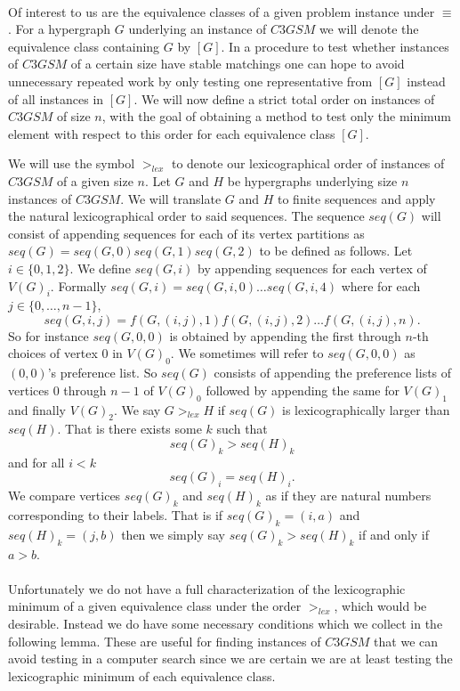 \paragraph{}
Of interest to us are the equivalence classes of a given problem instance under $\equiv$. For a hypergraph $G$ underlying an instance of $C3GSM$ we will denote the equivalence class containing $G$ by $[G]$. In a procedure to test whether instances of $C3GSM$ of a certain size have stable matchings one can hope to avoid unnecessary repeated work by only testing one representative from $[G]$ instead of all instances in $[G]$. We will now define a strict total order on instances of $C3GSM$ of size $n$, with the goal of obtaining a method to test only the minimum element with respect to this order for each equivalence class $[G]$.
\begin{definition}
We will use the symbol $>_{lex}$ to denote our lexicographical order of instances of $C3GSM$ of a given size $n$. Let $G$ and $H$ be hypergraphs underlying size $n$ instances of $C3GSM$. We will translate $G$ and $H$ to finite sequences and apply the natural lexicographical order to said sequences. The sequence $seq(G)$ will consist of appending sequences for each of its vertex partitions as $seq(G) = seq(G,0)seq(G,1)seq(G,2)$ to be defined as follows. Let $i \in \{0,1, 2\}$.  We define $seq(G,i)$ by appending sequences for each vertex of $V(G)_i$. Formally $seq(G,i) = seq(G,i,0)\dots seq(G,i,4)$ where for each $j \in \{0,\dots, n-1\}$,
$$seq(G,i,j) = f(G,(i,j),1)f(G,(i,j),2)\dots f(G,(i,j),n).$$
So for instance $seq(G,0, 0)$ is obtained by appending the first through $n$-th choices of vertex $0$ in $V(G)_0$. We sometimes will refer to $seq(G,0,0)$ as $(0,0)$'s preference list. So $seq(G)$ consists of appending the preference lists of vertices $0$ through $n-1$ of $V(G)_0$ followed by appending the same for $V(G)_1$ and finally $V(G)_2$.
We say $G >_{lex} H$ if $seq(G)$ is lexicographically larger than $seq(H)$. That is there exists some $k$ such that
$$seq(G)_k > seq(H)_k$$
and for all $i < k$
$$seq(G)_i = seq(H)_i.$$
We compare vertices $seq(G)_k$ and $ seq(H)_k$ as if they are natural numbers corresponding to their labels. That is if $seq(G)_k = (i,a)$ and $seq(H)_k = (j,b)$ then we simply say $seq(G)_k > seq(H)_k$ if and only if $a>b$. 
\end{definition}
\paragraph{}
Unfortunately we do not have a full characterization of the lexicographic minimum of a given equivalence class under the order $>_{lex}$, which would be desirable. Instead we do have some necessary conditions which we collect in the following lemma. These are useful for finding instances of $C3GSM$ that we can avoid testing in a computer search since we are certain we are at least testing the lexicographic minimum of each equivalence class.
